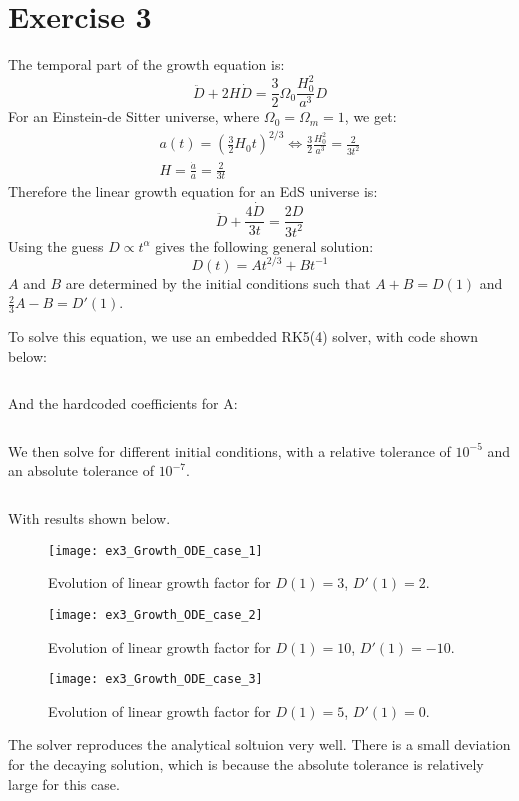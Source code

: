 \section*{Exercise 3}
The temporal part of the growth equation is:
\begin{equation}
\ddot D + 2 H \dot D = \frac{3}{2} \Omega_0 \frac{H_0^2}{a^3} D
\end{equation}
For an Einstein-de Sitter universe, where $\Omega_0 = \Omega_m = 1$, we get:
\begin{gather*}
a(t) = \left(\frac{3}{2} H_0 t\right)^{2/3} \iff
\frac{3}{2} \frac{H_0^2}{a^3} = \frac{2}{3t^2} \\
H = \frac{\dot a}{a} = \frac{2}{3t}
\end{gather*}
Therefore the linear growth equation for an EdS universe is:
\begin{equation}
\ddot D + \frac{4 \dot D}{3 t} = \frac{2D}{3t^2}
\end{equation}
Using the guess $D \propto t^\alpha$ gives the following general solution:
\begin{equation}
D(t) = A t^{2/3} + B t^{-1}
\end{equation}
$A$ and $B$ are determined by the initial conditions such that $A + B = D(1)$ and $\frac{2}{3}A - B = D'(1)$.

To solve this equation, we use an embedded RK5(4) solver, with code shown below:

\inputminted{Python}{../ODE.py}

And the hardcoded coefficients for A:

\inputminted{text}{../Tsit5A.txt}

We then solve for different initial conditions, with a relative tolerance of $10^{-5}$ and an absolute tolerance of $10^{-7}$.

\inputminted{Python}{../ex3.py}

With results shown below.

\begin{figure}[h]
  \centering
  \texttt{[image: ex3\_Growth\_ODE\_case\_1]}
  \caption{Evolution of linear growth factor for $D(1) = 3$, $D'(1)=2$.}
\end{figure}

\begin{figure}[h]
  \centering
  \texttt{[image: ex3\_Growth\_ODE\_case\_2]}
  \caption{Evolution of linear growth factor for $D(1) = 10$, $D'(1)=-10$.}
\end{figure}

\begin{figure}[h]
  \centering
  \texttt{[image: ex3\_Growth\_ODE\_case\_3]}
  \caption{Evolution of linear growth factor for $D(1) = 5$, $D'(1)=0$.}
\end{figure}

The solver reproduces the analytical soltuion very well.
There is a small deviation for the decaying solution, which is because the absolute tolerance is relatively large for this case.
\clearpage
